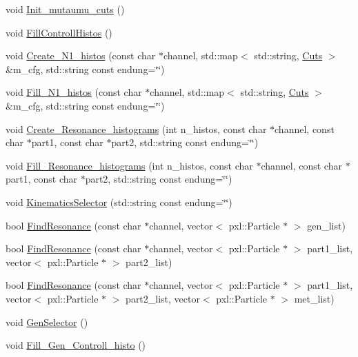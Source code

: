 \begin{DoxyCompactItemize}
void \hyperlink{classspecialAna_ad065f19da9d982699fb105d1670bb47e}{Init\-\_\-mutaumu\-\_\-cuts} ()
\item 
void \hyperlink{classspecialAna_a5a8d03afb432c7ce987b7d319cf475c4}{Fill\-Controll\-Histos} ()
\item 
void \hyperlink{classspecialAna_a24c1665cec24295951bb4a78442fdd83}{Create\-\_\-\-N1\-\_\-histos} (const char $\ast$channel, std\-::map$<$ std\-::string, \hyperlink{classCuts}{Cuts} $>$ \&m\-\_\-cfg, std\-::string const endung=\char`\"{}\char`\"{})
\item 
void \hyperlink{classspecialAna_a3ebe8a8f452b201a078c460a3e052854}{Fill\-\_\-\-N1\-\_\-histos} (const char $\ast$channel, std\-::map$<$ std\-::string, \hyperlink{classCuts}{Cuts} $>$ \&m\-\_\-cfg, std\-::string const endung=\char`\"{}\char`\"{})
\item 
void \hyperlink{classspecialAna_a7be51543df2b4fcbe5d4ae802028fffb}{Create\-\_\-\-Resonance\-\_\-histograms} (int n\-\_\-histos, const char $\ast$channel, const char $\ast$part1, const char $\ast$part2, std\-::string const endung=\char`\"{}\char`\"{})
\item 
void \hyperlink{classspecialAna_ae2c14a5d38214aee793dd6801b66b2c8}{Fill\-\_\-\-Resonance\-\_\-histograms} (int n\-\_\-histos, const char $\ast$channel, const char $\ast$part1, const char $\ast$part2, std\-::string const endung=\char`\"{}\char`\"{})
\item 
void \hyperlink{classspecialAna_a16ba40b9f9d027a4bd26859fd13642fc}{Kinematics\-Selector} (std\-::string const endung=\char`\"{}\char`\"{})
\item 
bool \hyperlink{classspecialAna_a5f15a75ae1b9dee9633dc4243e60f0ea}{Find\-Resonance} (const char $\ast$channel, vector$<$ pxl\-::\-Particle $\ast$ $>$ gen\-\_\-list)
\item 
bool \hyperlink{classspecialAna_a114fc22f04da620313ccada3cc1cf412}{Find\-Resonance} (const char $\ast$channel, vector$<$ pxl\-::\-Particle $\ast$ $>$ part1\-\_\-list, vector$<$ pxl\-::\-Particle $\ast$ $>$ part2\-\_\-list)
\item 
bool \hyperlink{classspecialAna_a897bc49eeef23f5982d4d6adadb3837b}{Find\-Resonance} (const char $\ast$channel, vector$<$ pxl\-::\-Particle $\ast$ $>$ part1\-\_\-list, vector$<$ pxl\-::\-Particle $\ast$ $>$ part2\-\_\-list, vector$<$ pxl\-::\-Particle $\ast$ $>$ met\-\_\-list)
\item 
void \hyperlink{classspecialAna_a1910a5c4831d81dd596b192231579994}{Gen\-Selector} ()
\item 
void \hyperlink{classspecialAna_a9ddbb4b17312c5eb0def21037db6eb93}{Fill\-\_\-\-Gen\-\_\-\-Controll\-\_\-histo} ()

\end{DoxyCompactItemize}
